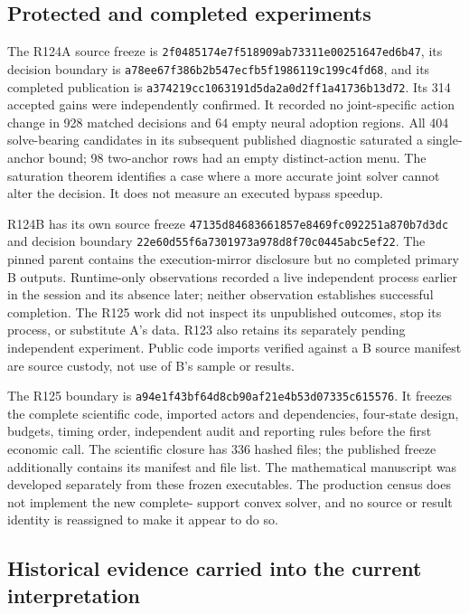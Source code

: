\subsection{Protected and completed experiments}

The R124A source freeze is
\nolinkurl{2f0485174e7f518909ab73311e00251647ed6b47}, its decision
boundary is \nolinkurl{a78ee67f386b2b547ecfb5f1986119c199c4fd68},
and its completed publication is
\nolinkurl{a374219cc1063191d5da2a0d2ff1a41736b13d72}.
Its 314 accepted gains were independently confirmed. It recorded no
joint-specific action change in 928 matched decisions and 64 empty neural
adoption regions. All 404 solve-bearing candidates in its subsequent
published diagnostic saturated a single-anchor bound; 98 two-anchor rows
had an empty distinct-action menu. The saturation theorem identifies a
case where a more accurate joint solver cannot alter the decision. It
does not measure an executed bypass speedup.

R124B has its own source freeze
\nolinkurl{47135d84683661857e8469fc092251a870b7d3dc} and decision
boundary \nolinkurl{22e60d55f6a7301973a978d8f70c0445abc5ef22}.
The pinned parent contains the execution-mirror disclosure but no completed
primary B outputs. Runtime-only observations recorded a live independent
process earlier in the session and its absence later; neither observation
establishes successful completion. The R125 work did not inspect its
unpublished outcomes, stop its process, or substitute A's data. R123 also
retains its separately pending independent experiment. Public code imports
verified against a B source manifest are source custody, not use of B's
sample or results.

The R125 boundary is
\nolinkurl{a94e1f43bf64d8cb90af21e4b53d07335c615576}. It freezes
the complete scientific code, imported actors and dependencies, four-state
design, budgets, timing order, independent audit and reporting rules before
the first economic call. The scientific closure has 336 hashed files;
the published freeze additionally contains its manifest and file list.
The mathematical manuscript was developed separately from these frozen
executables. The production census does not implement the new complete-
support convex solver, and no source or result identity is reassigned to
make it appear to do so.

\subsection{Historical evidence carried into the current interpretation}

